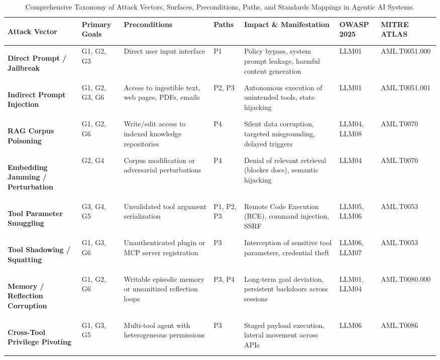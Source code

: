 \begin{table}[t]
\centering
\caption{Comprehensive Taxonomy of Attack Vectors, Surfaces, Preconditions, Paths, and Standards Mappings in Agentic AI Systems.}
\label{tab:taxonomy_summary}
\footnotesize
\setlength{\tabcolsep}{2.5pt}
\begin{tabularx}{\columnwidth}{>{\bfseries\raggedright\arraybackslash}p{1.9cm} >{\raggedright\arraybackslash}p{1.0cm} >{\raggedright\arraybackslash}X >{\centering\arraybackslash}p{0.8cm} >{\raggedright\arraybackslash}X >{\raggedright\arraybackslash}p{1.1cm} >{\raggedright\arraybackslash}p{1.5cm}}
\toprule
\textbf{Attack Vector} & \textbf{Primary Goals} & \textbf{Preconditions} & \textbf{Paths} & \textbf{Impact \& Manifestation} & \textbf{OWASP 2025} & \textbf{MITRE ATLAS} \\
\midrule
\textbf{Direct Prompt / Jailbreak} & G1, G2, G3 & Direct user input interface & P1 & Policy bypass, system prompt leakage, harmful content generation & LLM01 & AML.T0051.000 \\
\textbf{Indirect Prompt Injection} & G1, G2, G3, G6 & Access to ingestible text, web pages, PDFs, emails & P2, P3 & Autonomous execution of unintended tools, state hijacking & LLM01 & AML.T0051.001 \\
\textbf{RAG Corpus Poisoning} & G1, G2, G6 & Write/edit access to indexed knowledge repositories & P4 & Silent data corruption, targeted misgrounding, delayed triggers & LLM04, LLM08 & AML.T0070 \\
\textbf{Embedding Jamming / Perturbation} & G2, G4 & Corpus modification or adversarial perturbations & P4 & Denial of relevant retrieval (blocker docs), semantic hijacking & LLM04 & AML.T0070 \\
\textbf{Tool Parameter Smuggling} & G3, G4, G5 & Unvalidated tool argument serialization & P1, P2, P3 & Remote Code Execution (RCE), command injection, SSRF & LLM05, LLM06 & AML.T0053 \\
\textbf{Tool Shadowing / Squatting} & G1, G3, G6 & Unauthenticated plugin or MCP server registration & P3 & Interception of sensitive tool parameters, credential theft & LLM06, LLM07 & AML.T0053 \\
\textbf{Memory / Reflection Corruption} & G1, G2, G6 & Writable episodic memory or unsanitized reflection loops & P3, P4 & Long-term goal deviation, persistent backdoors across sessions & LLM01, LLM04 & AML.T0080.000 \\
\textbf{Cross-Tool Privilege Pivoting} & G1, G3, G5 & Multi-tool agent with heterogeneous permissions & P3 & Staged payload execution, lateral movement across APIs & LLM06 & AML.T0086 \\

\end{tabularx}
\end{table}
